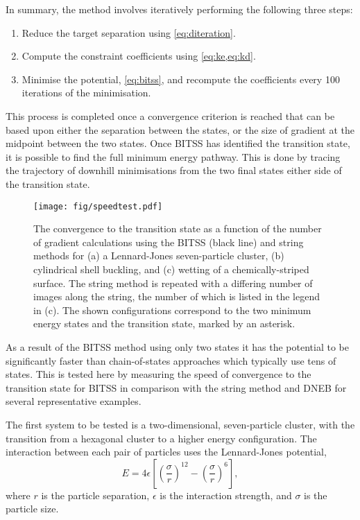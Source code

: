 \documentclass[aps,prl,twocolumn,10pt,groupedaddress]{revtex4-2}
\begin{document}
In summary, the method involves iteratively performing the following three steps:
\begin{enumerate}
  \item Reduce the target separation using \cref{eq:diteration}.
  \item Compute the constraint coefficients using \cref{eq:ke,eq:kd}.
  \item Minimise the potential, \cref{eq:bitss}, and recompute the coefficients every 100 iterations of the minimisation.
\end{enumerate}
This process is completed once a convergence criterion is reached that can be based upon either the separation between the states, or the size of gradient at the midpoint between the two states.
Once BITSS has identified the transition state, it is possible to find the full minimum energy pathway.
This is done by tracing the trajectory of downhill minimisations from the two final states either side of the transition state.


\begin{figure*}[tb]
  \texttt{[image: fig/speedtest.pdf]}
  \caption{\label{fig:speedtest}
    The convergence to the transition state as a function of the number of gradient calculations using the BITSS (black line) and string methods for (a) a Lennard-Jones seven-particle cluster, (b) cylindrical shell buckling, and (c) wetting of a chemically-striped surface.
    The string method is repeated with a differing number of images along the string, the number of which is listed in the legend in (c).
    The shown configurations correspond to the two minimum energy states and the transition state, marked by an asterisk.
  }
\end{figure*}
As a result of the BITSS method using only two states it has the potential to be significantly faster than chain-of-states approaches which typically use tens of states.
This is tested here by measuring the speed of convergence to the transition state for BITSS in comparison with the string method and DNEB for several representative examples.

The first system to be tested is a two-dimensional, seven-particle cluster, with the transition from a hexagonal cluster to a higher energy configuration.
The interaction between each pair of particles uses the Lennard-Jones potential,
\begin{equation}
  E = 4\epsilon \left[ \left(\frac{\sigma}{r}\right)^{12} - \left(\frac{\sigma}{r}\right)^6 \right],
\end{equation}
where $r$ is the particle separation, $\epsilon$ is the interaction strength, and $\sigma$ is the particle size.
\end{document}
